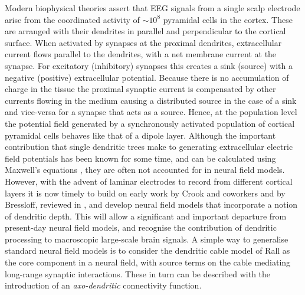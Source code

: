\documentclass[a4paper,final]{siamart190516}
\begin{document}
Modern biophysical theories assert that EEG signals from a single scalp
electrode arise from the coordinated activity of $\sim 10^8$ pyramidal cells in the
cortex.  These are arranged with their dendrites in parallel and perpendicular to the
cortical surface. When activated by synapses at the proximal
dendrites, extracellular current flows parallel to the dendrites, with a net
membrane current at the synapse. For excitatory (inhibitory) synapses this creates a
sink (source) with a negative (positive) extracellular potential.  Because there is
no accumulation of charge in the tissue the proximal synaptic current is compensated
by other currents flowing in the medium causing a distributed source in the case of a
sink and vice-versa for a synapse that acts as a source. Hence, at the population
level the potential field generated by a synchronously activated population of
cortical pyramidal cells behaves like that of a dipole layer.  Although the important
contribution that single dendritic trees make to generating extracellular electric
field potentials has been known for some time, and can be calculated using
Maxwell's equations \cite{Pettersen08}, they are often not accounted for in neural
field models.  However, with the advent of laminar electrodes to record from
different cortical layers it is now timely to build on early work by Crook and
coworkers \cite{crook1997role} and by Bressloff, reviewed in \cite{Bressloff97}, and develop neural field models that incorporate a
notion of dendritic depth.  This will allow a significant and important departure
from present-day neural field models, and recognise the contribution of dendritic
processing to macroscopic large-scale brain signals. A simple way to generalise
standard neural field models is to consider the dendritic cable model of Rall as the
core component in a neural field, with source terms on the cable mediating
long-range synaptic interactions.  These in turn can be described with the
introduction of an \textit{axo-dendritic} connectivity function.
\end{document}

